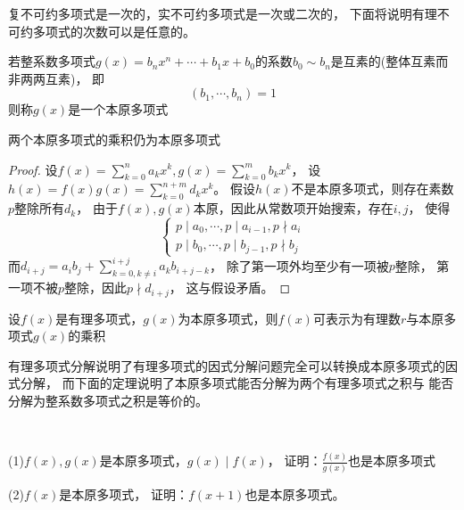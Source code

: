 复不可约多项式是一次的，实不可约多项式是一次或二次的，
下面将说明有理不可约多项式的次数可以是任意的。

\begin{definition}[本原多项式]
  若整系数多项式$g(x) = b_nx^n + \cdots + b_1 x + b_0$的系数$b_0 \sim b_n$是互素的(整体互素而非两两互素)，
  即
  \begin{equation*}
    (b_1,\cdots,b_n) = 1
  \end{equation*}
  则称$g(x)$是一个本原多项式
\end{definition}

\begin{theorem}[Gauss引理]
两个本原多项式的乘积仍为本原多项式
\end{theorem}

\begin{proof}
  设$f(x) = \sum\limits_{k = 0}^n a_kx^k, g(x) = \sum\limits_{k = 0}^m b_kx^k$，
  设$h(x) = f(x)g(x) = \sum\limits_{k = 0}^{n+m}d_kx^k$。
  假设$h(x)$不是本原多项式，则存在素数$p$整除所有$d_k$，
  由于$f(x),g(x)$本原，因此从常数项开始搜索，存在$i,j$，
  使得
  \begin{equation*}
    \begin{cases}
      p \mid a_0 , \cdots, p \mid a_{i-1}, p \nmid a_i\\
      p \mid b_0,\cdots, p \mid b_{j-1}, p \nmid b_j
    \end{cases}
  \end{equation*}
  而$d_{i+j} = a_ib_j + \sum\limits_{k = 0, k \neq i}^{i + j} a_k b_{i+j - k}$，
  除了第一项外均至少有一项被$p$整除，
  第一项不被$p$整除，因此$p \nmid d_{i+j}$，
  这与假设矛盾。
\end{proof}

\begin{theorem}[有理多项式变本原多项式]
  设$f(x)$是有理多项式，$g(x)$为本原多项式，则$f(x)$可表示为有理数$r$与本原多项式$g(x)$的乘积
\end{theorem}

\begin{note}
  有理多项式分解说明了有理多项式的因式分解问题完全可以转换成本原多项式的因式分解，
  而下面的定理说明了本原多项式能否分解为两个有理多项式之积与
  能否分解为整系数多项式之积是等价的。
\end{note}

~

\begin{exercise}[本原多项式]
  (1)$f(x),g(x)$是本原多项式，$g(x) \mid f(x)$，
  证明：$\frac{f(x)}{g(x)}$也是本原多项式

  (2)$f(x)$是本原多项式，
  证明：$f(x+1)$也是本原多项式。
\end{exercise}

